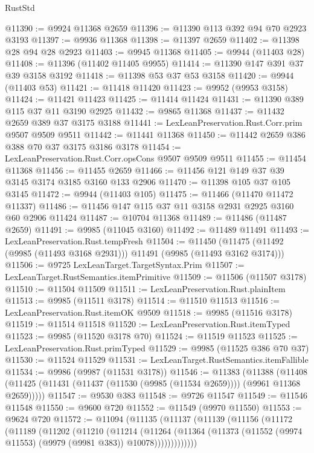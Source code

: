 \begin{lexlean}{RustStd}
\begin{coremodule}
@11390 := @9924 @11368 @2659
@11396 := @11390 @113 @392 @94 @70 @2923 @3193
@11397 := @9936 @11368
@11398 := @11397 @2659
@11402 := @11398 @28 @94 @28 @2923
@11403 := @9945 @11368
@11405 := @9944 (@11403 @28)
@11408 := @11396 (@11402 @11405 @9955)
@11414 := @11390 @147 @391 @37 @39 @3158 @3192
@11418 := @11398 @53 @37 @53 @3158
@11420 := @9944 (@11403 @53)
@11421 := @11418 @11420
@11423 := @9952 (@9953 @3158)
@11424 := @11421 @11423
@11425 := @11414 @11424
@11431 := @11390 @389 @115 @37 @11 @3190 @2925
@11432 := @9865 @11368
@11437 := @11432 @2659 @389 @37 @3175 @3188
@11441 := LexLeanPreservation.Rust.Corr.prim @9507 @9509 @9511
@11442 := @11441 @11368
@11450 := @11442 @2659 @386 @388 @70 @37 @3175 @3186 @3178
@11454 := LexLeanPreservation.Rust.Corr.opsCons @9507 @9509 @9511
@11455 := @11454 @11368
@11456 := @11455 @2659
@11466 := @11456 @121 @149 @37 @39 @3145 @3174 @3185 @3160 @133 @2906
@11470 := @11398 @105 @37 @105 @3145
@11472 := @9944 (@11403 @105)
@11475 := @11466 (@11470 @11472 @11337)
@11486 := @11456 @147 @115 @37 @11 @3158 @2931 @2925 @3160 @60 @2906 @11424
@11487 := @10704 @11368
@11489 := @11486 (@11487 @2659)
@11491 := @9985 (@11045 @3160)
@11492 := @11489 @11491
@11493 := LexLeanPreservation.Rust.tempFresh
@11504 := @11450 (@11475 (@11492 (@9985 (@11493 @3168 @2931))) @11491 (@9985 (@11493 @3162 @3174)))
@11506 := @9725 LexLeanTarget.TargetSyntax.Prim
@11507 := LexLeanTarget.RustSemantics.itemPrimitive
@11509 := @11506 (@11507 @3178)
@11510 := @11504 @11509
@11511 := LexLeanPreservation.Rust.plainItem
@11513 := @9985 (@11511 @3178)
@11514 := @11510 @11513
@11516 := LexLeanPreservation.Rust.itemOK @9509
@11518 := @9985 (@11516 @3178)
@11519 := @11514 @11518
@11520 := LexLeanPreservation.Rust.itemTyped
@11523 := @9985 (@11520 @3178 @70)
@11524 := @11519 @11523
@11525 := LexLeanPreservation.Rust.primTyped
@11529 := @9985 (@11525 @386 @70 @37)
@11530 := @11524 @11529
@11531 := LexLeanTarget.RustSemantics.itemFallible
@11534 := @9986 (@9987 (@11531 @3178))
@11546 := @11383
    (@11388
      (@11408 (@11425 (@11431 (@11437 (@11530 (@9985 (@11534 @2659)))) (@9961 @11368 @2659)))))
@11547 := @9530 @383
@11548 := @9726 @11547
@11549 := @11546 @11548
@11550 := @9600 @720
@11552 := @11549 (@9970 @11550)
@11553 := @9624 @720
@11572 := @11094
    (@11135
      (@11137
        (@11139
          (@11156
            (@11172
              (@11189
                (@11202
                  (@11210
                    (@11214
                      (@11264
                        (@11364
                          (@11373 (@11552 (@9974 @11553) (@9979 (@9981 @383)) @10078)))))))))))))

\end{coremodule}
\end{lexlean}
